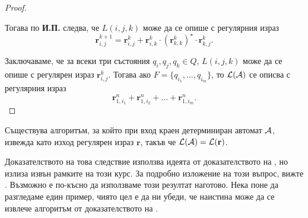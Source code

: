 \begin{proof}
\begin{enumerate}[a)]
    Тогава по {\bf И.П.} следва, че $L(i,j,k)$ може да се опише с регулярния израз
    \begin{equation}
      \label{eq:kleene}
      \mathbf{r}^{k+1}_{i,j} = \mathbf{r}^{k}_{i,j} + \mathbf{r}^{k}_{i,k}\cdot (\mathbf{r}^{k}_{k,k})^\star\cdot \mathbf{r}^{k}_{k,j}.
    \end{equation}
  \end{enumerate}
  Заключаваме, че за всеки три състояния $q_i,q_j,q_k \in Q$, $L(i,j,k)$ може да се опише с регулярен израз $\mathbf{r}^{k}_{i,j}$.
  Тогава ако $F = \{q_{i_1},\dots,q_{i_m}\}$, то $\mathcal{L}(\mathcal{A})$ се описва с регулярния израз
  \[\mathbf{r}^n_{1,i_1} + \mathbf{r}^n_{1,i_2} + \dots + \mathbf{r}^n_{1,i_m}.\]
\end{proof}

\begin{cor}
  Съществува алгоритъм, за който при вход краен детерминиран автомат $\mathcal{A}$,
  извежда като изход регулярен израз $\mathbf{r}$, такъв че $\mathcal{L}(\mathcal{A}) = \mathcal{L}(\mathbf{r})$.
\end{cor}

Доказателството на това следствие използва идеята от доказателството на ,
но излиза извън рамките на този курс. За подробно изложение на този въпрос, вижте \cite[стр. 69]{sipser3}.
Възможно е по-късно да използваме този резултат наготово.
Нека поне да разгледаме един пример, чиято цел е да ни убеди, 
че наистина може да се извлече алгоритъм от доказателството на .

